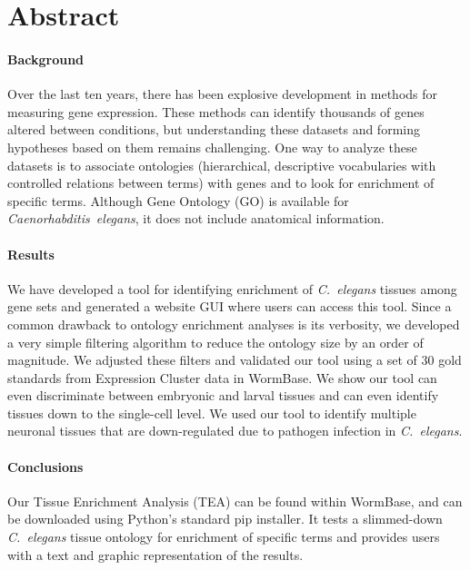 \usepackage{subcaption} %
\usepackage{csvsimple} %
\usepackage{caption}
\usepackage{adjustbox}


\section*{Abstract} %
\paragraph{Background} %
Over the last ten years, there has been explosive development in methods
for measuring gene expression. These methods can identify thousands of
genes altered between conditions, but understanding these datasets and forming
hypotheses based on them remains challenging. One way to analyze these datasets
is to associate ontologies (hierarchical, descriptive vocabularies
with controlled relations between terms) with genes and to look for enrichment
of specific terms. Although Gene Ontology (GO) is available for
\emph{Caenorhabditis~elegans}, it does not include anatomical information.
\paragraph{Results} %
We have developed a tool for identifying  enrichment of \emph{C.~elegans} tissues
among gene sets and generated a website GUI where users can access this tool.
Since a common drawback to ontology enrichment analyses is its verbosity, we
developed a very simple filtering algorithm to reduce the ontology size by an
order of magnitude. We adjusted these filters and validated our tool using a set
of 30  gold standards from Expression Cluster data in WormBase. We show our tool
can even discriminate between embryonic and larval tissues and can even identify
tissues down to the single-cell level. We used our tool to identify multiple
neuronal tissues that are down-regulated due to pathogen infection in
\emph{C.~elegans}.
\paragraph{Conclusions} %
Our Tissue Enrichment Analysis (TEA) can be found within WormBase, and can be
downloaded using Python's standard pip installer. It tests a slimmed-down
\emph{C.~elegans} tissue ontology for enrichment of specific terms and provides
users with a  text and graphic representation of the results.

